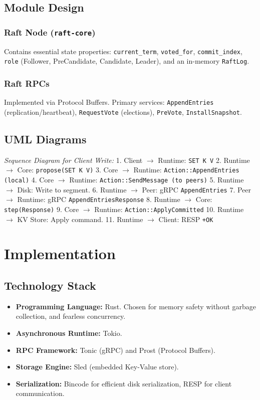 \documentclass[12pt,a4paper]{report}
\begin{document}
\section{Module Design}
\subsection{Raft Node (\texttt{raft-core})}
Contains essential state properties: \texttt{current\_term}, \texttt{voted\_for}, \texttt{commit\_index}, \texttt{role} (Follower, PreCandidate, Candidate, Leader), and an in-memory \texttt{RaftLog}.
\subsection{Raft RPCs}
Implemented via Protocol Buffers. Primary services: \texttt{AppendEntries} (replication/heartbeat), \texttt{RequestVote} (elections), \texttt{PreVote}, \texttt{InstallSnapshot}.

\section{UML Diagrams}
\textit{Sequence Diagram for Client Write:}
1. Client $\rightarrow$ Runtime: \texttt{SET K V}
2. Runtime $\rightarrow$ Core: \texttt{propose(SET K V)}
3. Core $\rightarrow$ Runtime: \texttt{Action::AppendEntries (local)}
4. Core $\rightarrow$ Runtime: \texttt{Action::SendMessage (to peers)}
5. Runtime $\rightarrow$ Disk: Write to segment.
6. Runtime $\rightarrow$ Peer: gRPC \texttt{AppendEntries}
7. Peer $\rightarrow$ Runtime: gRPC \texttt{AppendEntriesResponse}
8. Runtime $\rightarrow$ Core: \texttt{step(Response)}
9. Core $\rightarrow$ Runtime: \texttt{Action::ApplyCommitted}
10. Runtime $\rightarrow$ KV Store: Apply command.
11. Runtime $\rightarrow$ Client: RESP \texttt{+OK}


\chapter{Implementation}

\section{Technology Stack}
\begin{itemize}
    \item \textbf{Programming Language:} Rust. Chosen for memory safety without garbage collection, and fearless concurrency.
    \item \textbf{Asynchronous Runtime:} Tokio.
    \item \textbf{RPC Framework:} Tonic (gRPC) and Prost (Protocol Buffers).
    \item \textbf{Storage Engine:} Sled (embedded Key-Value store).
    \item \textbf{Serialization:} Bincode for efficient disk serialization, RESP for client communication.
\end{itemize}
\end{document}
